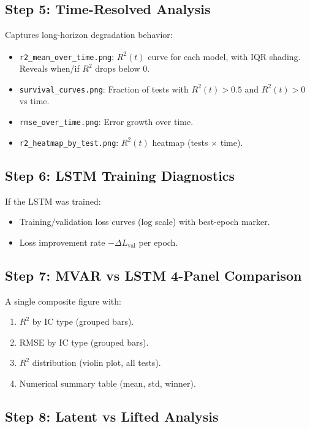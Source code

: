 \documentclass[11pt]{article}
\begin{document}
\subsection{Step 5: Time-Resolved Analysis}

Captures long-horizon degradation behavior:
\begin{itemize}[nosep]
    \item \texttt{r2\_mean\_over\_time.png}: $\overline{R^2}(t)$ curve for each model,
        with IQR shading. Reveals when/if $R^2$ drops below 0.
    \item \texttt{survival\_curves.png}: Fraction of tests with $R^2(t)>0.5$
        and $R^2(t)>0$ vs time.
    \item \texttt{rmse\_over\_time.png}: Error growth over time.
    \item \texttt{r2\_heatmap\_by\_test.png}: $R^2(t)$ heatmap (tests $\times$ time).
\end{itemize}

\subsection{Step 6: LSTM Training Diagnostics}

If the LSTM was trained:
\begin{itemize}[nosep]
    \item Training/validation loss curves (log scale) with best-epoch marker.
    \item Loss improvement rate $-\Delta L_{\text{val}}$ per epoch.
\end{itemize}

\subsection{Step 7: MVAR vs LSTM 4-Panel Comparison}

A single composite figure with:
\begin{enumerate}[nosep]
    \item $R^2$ by IC type (grouped bars).
    \item RMSE by IC type (grouped bars).
    \item $R^2$ distribution (violin plot, all tests).
    \item Numerical summary table (mean, std, winner).
\end{enumerate}

\subsection{Step 8: Latent vs Lifted Analysis}
\end{document}
